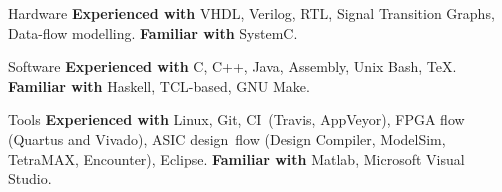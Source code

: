 
\begin{cvskills}

\cvskill
{Hardware}
{\textbf{Experienced with} VHDL, Verilog, RTL, Signal Transition Graphs, 
Data-flow modelling. \textbf{Familiar with} SystemC.}

\cvskill
{Software}
{\textbf{Experienced with} C, C++, Java, Assembly, Unix Bash, TeX. 
\textbf{Familiar with} Haskell, TCL-based, GNU Make.}

\cvskill
{Tools}
{\textbf{Experienced with} Linux, Git, CI~(Travis, AppVeyor), FPGA 
flow (Quartus and Vivado), ASIC design~flow (Design Compiler, ModelSim, 
TetraMAX, Encounter), Eclipse. \textbf{Familiar with} Matlab, 
Microsoft Visual 
Studio.}

\end{cvskills}
\vspace{-1mm}

